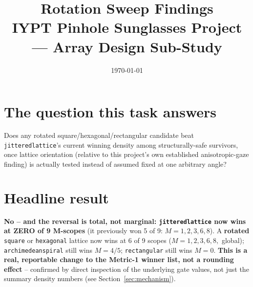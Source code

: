 \documentclass[11pt]{article}
\title{Rotation Sweep Findings\\
\large IYPT Pinhole Sunglasses Project --- Array Design Sub-Study}
\author{}
\date{\today}
\renewcommand{\_}{\origunderscore\penalty0\hskip0pt\relax}
\begin{document}
\maketitle

\section{The question this task answers}
Does any rotated square/hexagonal/rectangular candidate beat
\texttt{jittered\_lattice}'s current winning density among structurally-safe
survivors, once lattice orientation (relative to this project's own established
anisotropic-gaze finding) is actually tested instead of assumed fixed at one
arbitrary angle?

\section{Headline result}
\textbf{No -- and the reversal is total, not marginal: \texttt{jittered\_lattice}
now wins at ZERO of 9 M-scopes} (it previously won 5 of 9: $M=1,2,3,6,8$). A
\textbf{rotated} \texttt{square} or \texttt{hexagonal} lattice now wins at 6 of 9
scopes ($M=1,2,3,6,8,$ global); \texttt{archimedean\_spiral} still wins
$M=4/5$; \texttt{rectangular} still wins $M=0$. \textbf{This is a real,
reportable change to the Metric-1 winner list, not a rounding effect} --
confirmed by direct inspection of the underlying gate values, not just the
summary density numbers (see Section~\ref{sec:mechanism}).
\end{document}
